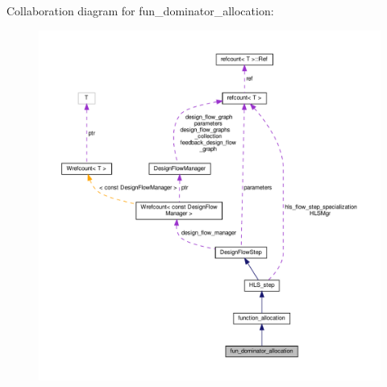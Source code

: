 Collaboration diagram for fun\+\_\+dominator\+\_\+allocation\+:
\nopagebreak
\begin{figure}[H]
\begin{center}
\leavevmode
\includegraphics[width=350pt]{d7/db3/classfun__dominator__allocation__coll__graph}
\end{center}
\end{figure}
